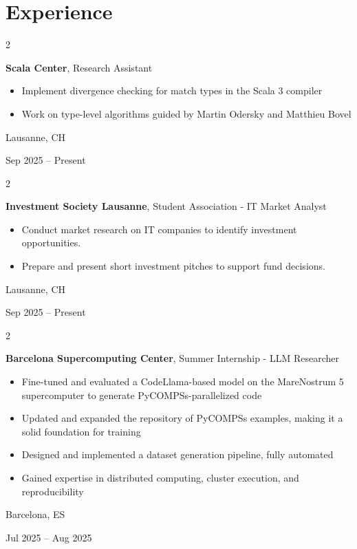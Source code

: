 \documentclass[10pt, letterpaper]{article}
\newenvironment{highlights}{
    \begin{itemize}[
        topsep=0.10 cm,
        parsep=0.10 cm,
        partopsep=0pt,
        itemsep=0pt,
        leftmargin=0.4 cm + 10pt
    ]
}{
    \end{itemize}
} %
\newenvironment{twocolentry}[2][]{
    \onecolentry
    \def\secondColumn{#2}
    \setcolumnwidth{\fill, 4.5 cm}
    \begin{paracol}{2}
}{
    \switchcolumn \raggedleft \secondColumn
    \end{paracol}
    \endonecolentry
} %
\begin{document}
    \section{Experience}

        \begin{twocolentry}{
            Lausanne, CH

            Sep 2025 – Present
        }
            \textbf{Scala Center}, Research Assistant
            \begin{highlights}
                \item Implement divergence checking for match types in the Scala 3 compiler
                \item Work on type-level algorithms guided by Martin Odersky and Matthieu Bovel
            \end{highlights}
        \end{twocolentry}

        \begin{twocolentry}{
            Lausanne, CH

            Sep 2025 – Present
        }
            \textbf{Investment Society Lausanne}, Student Association - IT Market Analyst
            \begin{highlights}
                \item Conduct market research on IT companies to identify investment opportunities.
                \item Prepare and present short investment pitches to support fund decisions.
            \end{highlights}
        \end{twocolentry}

       \begin{twocolentry}{
            Barcelona, ES

            Jul 2025 – Aug 2025
        }
            \textbf{Barcelona Supercomputing Center}, Summer Internship - LLM Researcher
            \begin{highlights}
                \item Fine-tuned and evaluated a CodeLlama-based model on the MareNostrum 5 supercomputer to generate PyCOMPSs-parallelized code
                \item Updated and expanded the repository of PyCOMPSs examples, making it a solid foundation for training
                \item Designed and implemented a dataset generation pipeline, fully automated 
                \item Gained expertise in distributed computing, cluster execution, and reproducibility
            \end{highlights}
        \end{twocolentry}
\end{document}
